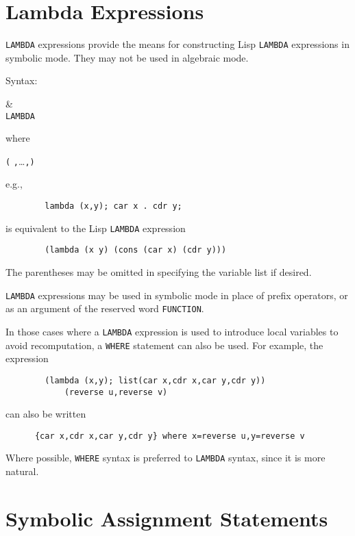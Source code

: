 \section{Lambda Expressions}
\hypertarget{reserved:LAMBDA}{}
\label{sec-lambda}

\texttt{LAMBDA} expressions provide the means for constructing Lisp \texttt{LAMBDA}
expressions in symbolic mode. They may not be used in algebraic mode.

Syntax:
\begin{syntaxtable}
      \bnfprod& \\
        \qquad \texttt{LAMBDA } 
\end{syntaxtable}
 where
\begin{syntax}
      \bnfprod \texttt{(} \texttt{,}\dots\texttt{,}\texttt{)}
\end{syntax}
e.g.,
\begin{verbatim}
        lambda (x,y); car x . cdr y;
\end{verbatim}
is equivalent to the Lisp \texttt{LAMBDA} expression
\begin{verbatim}
        (lambda (x y) (cons (car x) (cdr y)))
\end{verbatim}
The parentheses may be omitted in specifying the variable list if desired.

\texttt{LAMBDA} expressions may be used in symbolic mode in place of prefix
operators, or as an argument of the reserved word \texttt{FUNCTION}.

In those cases where a \texttt{LAMBDA} expression is used to introduce local
variables to avoid recomputation, a \texttt{WHERE} statement can also be
used.  For example, the expression
\begin{verbatim}
        (lambda (x,y); list(car x,cdr x,car y,cdr y))
            (reverse u,reverse v)
\end{verbatim}
can also be written
\begin{verbatim}
      {car x,cdr x,car y,cdr y} where x=reverse u,y=reverse v
\end{verbatim}
Where possible, \texttt{WHERE} syntax is preferred to \texttt{LAMBDA} syntax,
since it is more natural.

\section{Symbolic Assignment Statements}
\hypertarget{command:SETQ}{}

